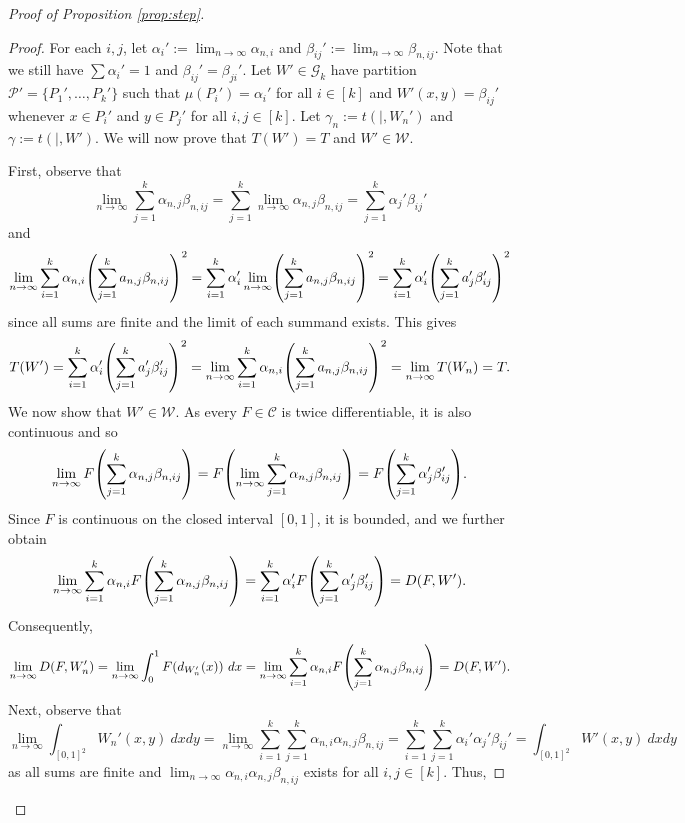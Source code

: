 \documentclass[11pt]{article}
\let\originalleft\left
\let\originalright\right
\renewcommand{\left}{\mathopen{}\mathclose\bgroup\originalleft}
\renewcommand{\right}{\aftergroup\egroup\originalright}
\theoremstyle{definition}
\newcommand{\paren}[1]{\left( #1 \right)}
\newcommand{\C}{\mathscr{C}}
\begin{document}
\begin{proof}[Proof of Proposition \ref{prop:step}]
\begin{proof}
        For each $i,j$, let $\alpha_i':=\lim_{n \to \infty} \alpha_{n,i}$ and $\beta_{ij}':=\lim_{n \to \infty}\beta_{n, ij}$. Note that we still have $\sum \alpha_i' = 1$ and $\beta_{ij}' = \beta_{ji}'$. Let $W' \in \mathcal G_k$ have partition $\mathcal{P}' = \{ P_1', \ldots, P_k'\}$ such that $\mu (P_i') = \alpha_i'$ for all $i \in [k]$ and $W'(x,y) = \beta_{ij}'$ whenever $x \in P_i'$ and $y \in P_j'$ for all $i,j \in [k]$.      
        Let $\gamma_n := t (|, W_n')$ and $\gamma := t (|, W')$. We will now prove that $T(W')=T$ and $W' \in \mathcal W$. 


        First, observe that
        \[\lim_{n \to \infty}  \sum_{j = 1}^k \alpha_{n,j} \beta_{n,ij} =  \sum_{j = 1}^k  \lim_{n \to \infty} \alpha_{n,j} \beta_{n,ij} = \sum_{j = 1}^k \alpha_j' \beta_{ij}'\] and 
        \[\lim_{n \to \infty} \sum_{i = 1}^k \alpha_{n,i} \paren{\sum_{j = 1}^k a_{n,j} \beta_{n, ij}}^2 = \sum_{i = 1}^k \alpha_{i}' \lim_{n \to \infty} \paren{\sum_{j = 1}^k a_{n,j} \beta_{n, ij}}^2 = \sum_{i = 1}^k \alpha_i' \paren{\sum_{j = 1}^k a_j' \beta_{ij}'}^2\] 
        since all sums are finite and the limit of each summand exists. 
        This gives
        \[ T (W')=\sum_{i = 1}^k \alpha_i' \paren{\sum_{j = 1}^k a_j' \beta_{ij}'}^2 =\lim_{n \to \infty} \sum_{i = 1}^k \alpha_{n,i}  \paren{\sum_{j = 1}^k a_{n,j} \beta_{n, ij}}^2 = \lim_{n \to \infty} T(W_n)=T. \]
        We now show that $W' \in \mathcal W$. As every $F \in \C$ is twice differentiable, it is also continuous and so 
        \[\lim_{n \to \infty} F \paren{\sum_{j = 1}^k \alpha_{n,j} \beta_{n,ij}} =
        F \paren{\lim_{n \to \infty} \sum_{j = 1}^k \alpha_{n,j} \beta_{n,ij}} =
        F \paren{\sum_{j = 1}^k \alpha_j' \beta_{ij}'}.\]
        Since $F$ is continuous on the closed interval $[0,1]$, it is bounded, and we further obtain 
        \[\lim_{n \to \infty} \sum_{i = 1}^k  \alpha_{n,i} F \paren{\sum_{j = 1}^k \alpha_{n,j} \beta_{n,ij}} = \sum_{i = 1}^k \alpha_i' F \left(\sum_{j = 1}^k \alpha_j' \beta_{ij}'\right)=D(F, W').\]
        Consequently, 
        \[\lim_{n \to \infty} D (F, W_n') = \lim_{n \to \infty} \int_0^1 F (d_{W_n'} (x)) ~dx 
        = \lim_{n \to \infty} \sum_{i = 1}^k \alpha_{n,i} F \paren{\sum_{j = 1}^k \alpha_{n,j} \beta_{n,ij}} = D (F, W').\]
        Next, observe that 
        \[ \lim_{n \to \infty} \int_{[0,1]^2} W_n' (x,y) ~dx dy = \lim_{n \to \infty} \sum_{i = 1}^k \sum_{j = 1}^k \alpha_{n, i} \alpha_{n,j} \beta_{n, ij} = \sum_{i = 1}^k \sum_{j = 1}^k \alpha_i' \alpha_j' \beta_{ij}' = \int_{[0,1]^2} W' (x,y) ~dx dy \]
        as all sums are finite and $\lim_{n \to \infty} \alpha_{n, i} \alpha_{n,j} \beta_{n, ij}$ exists for all $i,j \in [k]$. Thus,

\end{proof}
\end{proof}
\end{document}
